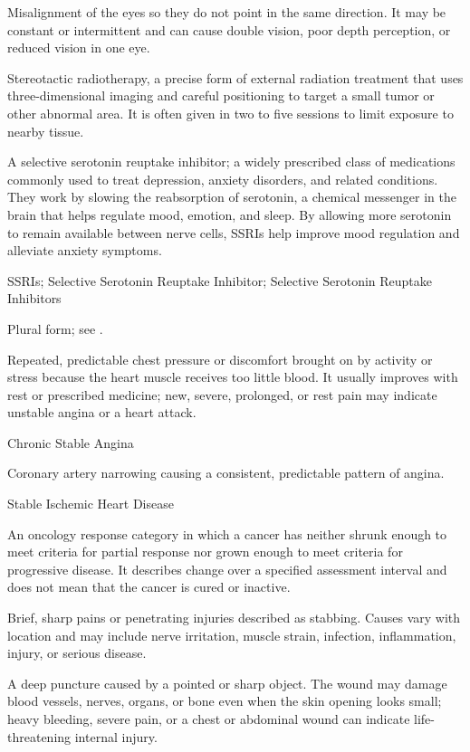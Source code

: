  Misalignment of the eyes so they do not point in the same direction. It may be constant or intermittent and can cause double vision, poor depth perception, or reduced vision in one eye.

 Stereotactic radiotherapy, a precise form of external radiation treatment that uses three-dimensional imaging and careful positioning to target a small tumor or other abnormal area. It is often given in two to five sessions to limit exposure to nearby tissue.

 A selective serotonin reuptake inhibitor; a widely prescribed class of medications commonly used to treat depression, anxiety disorders, and related conditions. They work by slowing the reabsorption of serotonin, a chemical messenger in the brain that helps regulate mood, emotion, and sleep. By allowing more serotonin to remain available between nerve cells, SSRIs help improve mood regulation and alleviate anxiety symptoms.

\synonyms
SSRIs; Selective Serotonin Reuptake Inhibitor; Selective Serotonin Reuptake Inhibitors

 Plural form; see .

 Repeated, predictable chest pressure or discomfort brought on by activity or stress because the heart muscle receives too little blood. It usually improves with rest or prescribed medicine; new, severe, prolonged, or rest pain may indicate unstable angina or a heart attack.

\synonyms
Chronic Stable Angina

 Coronary artery narrowing causing a consistent, predictable pattern of angina.

\synonyms
Stable Ischemic Heart Disease

 An oncology response category in which a cancer has neither shrunk enough to meet criteria for partial response nor grown enough to meet criteria for progressive disease. It describes change over a specified assessment interval and does not mean that the cancer is cured or inactive.

 Brief, sharp pains or penetrating injuries described as stabbing. Causes vary with location and may include nerve irritation, muscle strain, infection, inflammation, injury, or serious disease.

 A deep puncture caused by a pointed or sharp object. The wound may damage blood vessels, nerves, organs, or bone even when the skin opening looks small; heavy bleeding, severe pain, or a chest or abdominal wound can indicate life-threatening internal injury.

